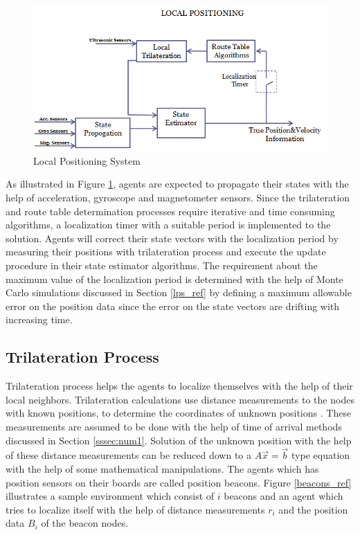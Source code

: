 \begin{figure}[H]
\caption{Local Positioning System} \label{figure_lps}
\centering
\includegraphics[scale = 0.65]{lps}
\end{figure}

As illustrated in Figure \ref{figure_lps}, agents are expected to propagate their states with the help of acceleration, gyroscope and magnetometer sensors. Since the trilateration and route table determination processes require iterative and time consuming algorithms, a localization timer with a suitable period is implemented to the solution. Agents will correct their state vectors with the localization period by measuring their positions with trilateration process and execute the update procedure in their state estimator algorithms. The requirement about the maximum value of the localization period is determined with the help of Monte Carlo simulations discussed in Section \ref{lps_ref} by defining a maximum allowable error on the position data since the error on the state vectors are drifting with increasing time.   

\subsection{Trilateration Process}
Trilateration process helps the agents to localize themselves with the help of their local neighbors.  Trilateration calculations use distance measurements to the nodes with known positions, to determine the coordinates of unknown positions \cite{22}. These measurements are assumed to be done with the help of time of arrival methods discussed in Section \ref{sssec:num1}.  Solution of the unknown position with the help of these distance measurements can be reduced down to a $A\vec{x} = \vec{b}$ type equation with the help of some mathematical manipulations. The agents which has position sensors on their boards are called position beacons. Figure \ref{beacons_ref} illustrates a sample environment which consist of $i$ beacons and an agent which tries to localize itself with the help of distance measurements $r_i$ and the position data $B_i$ of the beacon nodes.

